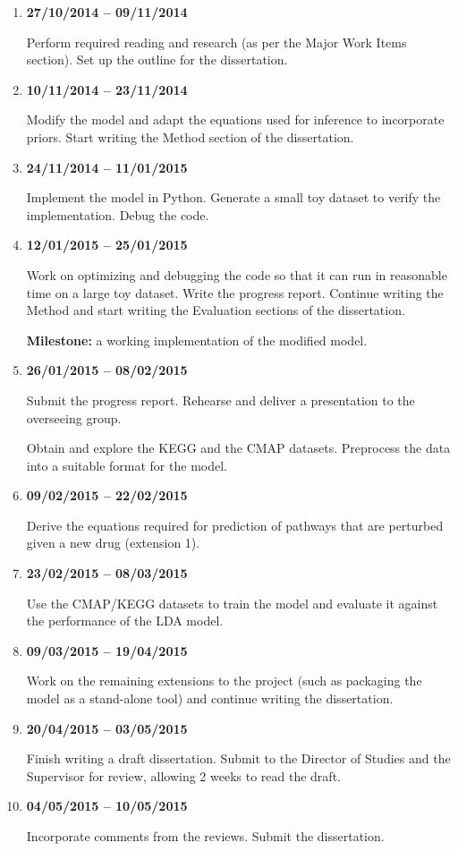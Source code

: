 \documentclass[12pt,a4]{article}
\begin{document}
\begin{enumerate}

\item {\bf 27/10/2014 -- 09/11/2014} 

Perform required reading and research (as per the Major Work Items section). Set up the outline for the dissertation.

\item {\bf 10/11/2014 -- 23/11/2014} 

Modify the model and adapt the equations used for inference to incorporate priors. Start writing the Method section of the dissertation.

\item {\bf 24/11/2014 -- 11/01/2015} 

Implement the model in Python. Generate a small toy dataset to verify the implementation. Debug the code.

\item {\bf 12/01/2015 -- 25/01/2015}

Work on optimizing and debugging the code so that it can run in reasonable time on a large toy dataset. Write the progress report. Continue writing the Method and start writing the Evaluation sections of the dissertation.

\textbf{Milestone:} a working implementation of the modified model. 

\item {\bf 26/01/2015 -- 08/02/2015} 

Submit the progress report. Rehearse and deliver a presentation to the overseeing group.

Obtain and explore the KEGG and the CMAP datasets. Preprocess the data into a suitable format for the model.

\item {\bf 09/02/2015 -- 22/02/2015}

Derive the equations required for prediction of pathways that are perturbed given a new drug (extension 1).

\item {\bf 23/02/2015 -- 08/03/2015}

Use the CMAP/KEGG datasets to train the model and evaluate it against the performance of the LDA model.

\item {\bf 09/03/2015 -- 19/04/2015}

Work on the remaining extensions to the project (such as packaging the model as a stand-alone tool) and continue writing the dissertation.

\item {\bf 20/04/2015 -- 03/05/2015}

Finish writing a draft dissertation. Submit to the Director of Studies and the Supervisor for review, allowing 2 weeks to read the draft.

\item {\bf 04/05/2015 -- 10/05/2015}

Incorporate comments from the reviews. Submit the dissertation.

\end{enumerate}

%
\end{document}
